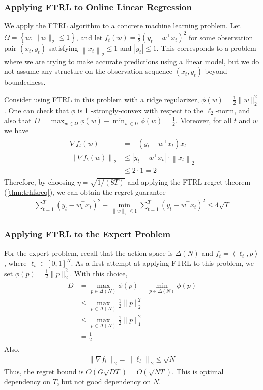 \documentclass{article}
\begin{document}
\subsubsection{Applying FTRL to Online Linear Regression}
We apply the FTRL algorithm to a concrete machine learning problem. Let $\Omega=\left\{w :\|w\|_{2} \leq 1\right\}$, and let $f_{t}(w )=\frac{1}{2}\left(y_{t}-w ^{\top} x_{t}\right)^{2}$ for some observation pair $\left(x_{t}, y_{t}\right)$ satisfying $\left\|x_{t}\right\|_{2} \leq 1$ and $\left|y_{t}\right| \leq 1$. This corresponds to a problem where we are trying to make accurate predictions using a linear model, but we do not assume any structure on the observation sequence $\left(x_{t}, y_{t}\right)$ beyond boundedness.

Consider using FTRL in this problem with a ridge regularizer, $\phi(w )=\frac{1}{2}\|w\|_{2}^{2}$. One can check that $\phi$ is 1 -strongly-convex with respect to the $\ell_{2}$-norm, and also that $D=\max _{w  \in \Omega} \phi(w )-\min _{w  \in \Omega} \phi(w )=\frac{1}{2}$. Moreover, for all $t$ and $w$ we have
\begin{align*}
\begin{aligned}
\nabla f_{t}(w) &=-\left(y_{t}-w^{\top} x_{t}\right) x_{t} \\
\left\|\nabla f_{t}(w)\right\|_{2} & \leq\left|y_{t}-w^{\top} x_{t}\right| \cdot\left\|x_{t}\right\|_{2} \\
& \leq 2 \cdot 1=2
\end{aligned}
\end{align*}
Therefore, by choosing $\eta=\sqrt{1 /(8 T)}$ and applying the FTRL regret theorem (\cref{thm:trhfsreq}), we can obtain the regret guarantee
\begin{align*}
\sum_{t=1}^{T}\left(y_{t}-w_{t}^{\top} x_{t}\right)^{2}-\min _{\|w\|_{2} \leq 1} \sum_{t=1}^{T}\left(y_{t}-w^{\top} x_{t}\right)^{2} \leq 4 \sqrt{T}
\end{align*}
\subsubsection{Applying FTRL to the Expert Problem}
For the expert problem, recall that the action space is $\Delta(N)$ and $f_{t}=\left\langle\ell_{t}, p\right\rangle$, where $\ell_{t} \in[0,1]^{N}$. As a first attempt at applying FTRL to this problem, we set $\phi(p)=\frac{1}{2}\|p\|_{2}^{2}$. With this choice,
\begin{align*}
\begin{aligned}
D &=\max _{p \in \Delta(N)} \phi(p)-\min _{p \in \Delta(N)} \phi(p) \\
& \leq \max _{p \in \Delta(N)} \frac{1}{2}\|p\|_{2}^{2} \\
& \leq \max _{p \in \Delta(N)} \frac{1}{2}\|p\|_{1}^{2} \\
&=\frac{1}{2}
\end{aligned}
\end{align*}
Also,
\begin{align*}
\left\|\nabla f_{t}\right\|_{2}=\left\|\ell_{t}\right\|_{2} \leq \sqrt{N}
\end{align*}
Thus, the regret bound is $O(G \sqrt{D T})=O(\sqrt{N T})$. This is optimal dependency on $T$, but not good dependency on $N$.
\end{document}
